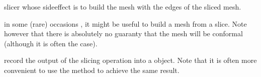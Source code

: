 \documentclass[a4paper,11pt,english]{sphinxmanual}
\begin{document}

\begin{fulllineitems}
\label{\detokenize{userdoc/export:_CPPv4N6getfem23slicer_build_edges_meshER4mesh}}%
\pysigstartmultiline
{}%
\pysigstopmultiline
slicer whose side\sphinxhyphen{}effect is to build the mesh  with the edges of
the sliced mesh.

\end{fulllineitems}


\begin{fulllineitems}
\label{\detokenize{userdoc/export:_CPPv4N6getfem17slicer_build_meshER4mesh}}%
\pysigstartmultiline
{}%
\pysigstopmultiline
in some (rare) occasions , it might be useful to build a mesh from a slice.
Note however that there is absolutely no guaranty that the mesh will be
conformal (although it is often the case).

\end{fulllineitems}


\begin{fulllineitems}
\label{\detokenize{userdoc/export:_CPPv4N6getfem30slicer_build_stored_mesh_sliceER17stored_mesh_slice}}%
\pysigstartmultiline
{}%
\pysigstopmultiline
record the output of the slicing operation into a  object. Note that it
is often more convenient to use the  method to
achieve the same result.

\end{fulllineitems}
\end{document}
